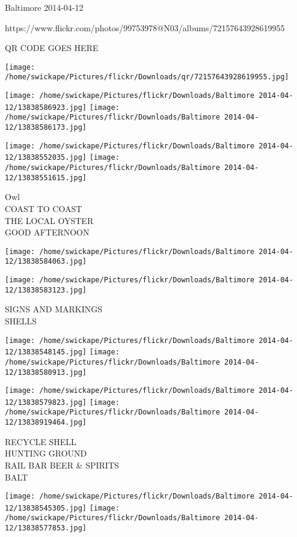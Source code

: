 \documentclass[10pt,letterpaper]{article}
\begin{document}
Baltimore 2014-04-12

https://www.flickr.com/photos/99753978@N03/albums/72157643928619955

QR CODE GOES HERE

\texttt{[image: /home/swickape/Pictures/flickr/Downloads/qr/72157643928619955.jpg]}
\pagebreak

\texttt{[image: /home/swickape/Pictures/flickr/Downloads/Baltimore 2014-04-12/13838586923.jpg]}
\texttt{[image: /home/swickape/Pictures/flickr/Downloads/Baltimore 2014-04-12/13838586173.jpg]}

\texttt{[image: /home/swickape/Pictures/flickr/Downloads/Baltimore 2014-04-12/13838552035.jpg]}
\texttt{[image: /home/swickape/Pictures/flickr/Downloads/Baltimore 2014-04-12/13838551615.jpg]}

Owl\\
COAST TO COAST\\
THE LOCAL OYSTER\\
GOOD AFTERNOON\\
\pagebreak

\texttt{[image: /home/swickape/Pictures/flickr/Downloads/Baltimore 2014-04-12/13838584063.jpg]}

\vspace{0.25in}
\texttt{[image: /home/swickape/Pictures/flickr/Downloads/Baltimore 2014-04-12/13838583123.jpg]}

SIGNS AND MARKINGS\\
SHELLS\\
\pagebreak

\texttt{[image: /home/swickape/Pictures/flickr/Downloads/Baltimore 2014-04-12/13838548145.jpg]}
\texttt{[image: /home/swickape/Pictures/flickr/Downloads/Baltimore 2014-04-12/13838580913.jpg]}

\texttt{[image: /home/swickape/Pictures/flickr/Downloads/Baltimore 2014-04-12/13838579823.jpg]}
\texttt{[image: /home/swickape/Pictures/flickr/Downloads/Baltimore 2014-04-12/13838919464.jpg]}

RECYCLE SHELL\\
HUNTING GROUND\\
RAIL BAR BEER \& SPIRITS\\
BALT\\
\pagebreak

\texttt{[image: /home/swickape/Pictures/flickr/Downloads/Baltimore 2014-04-12/13838545305.jpg]}
\texttt{[image: /home/swickape/Pictures/flickr/Downloads/Baltimore 2014-04-12/13838577853.jpg]}
\end{document}
